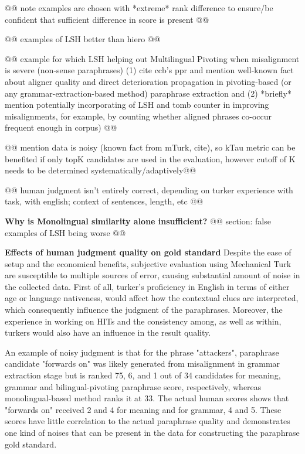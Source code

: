 \documentclass[11pt]{article}
\begin{document}
@@ note examples are chosen with *extreme* rank difference to ensure/be confident that sufficient difference in score is present @@

@@ examples of LSH better than hiero @@


@@ example for which LSH helping out Multilingual Pivoting when misalignment is severe (non-sense paraphrases) (1) cite ccb's ppr and mention well-known fact about aligner quality and direct deterioration propagation in pivoting-based (or any grammar-extraction-based method) paraphrase extraction and (2) *briefly* mention potentially incorporating of LSH and tomb counter in improving misalignments, for example, by counting whether aligned phrases co-occur frequent enough in corpus) @@






@@ mention data is noisy (known fact from mTurk, cite), so kTau metric can be benefited if only topK candidates are used in the evaluation, however cutoff of K needs to be determined systematically/adaptively@@

@@ human judgment isn't entirely correct, depending on turker experience with task, with english; context of sentences, length, etc @@

{\bf Why is Monolingual similarity alone insufficient?}
@@ section: false examples of LSH being worse @@

{\bf Effects of human judgment quality on gold standard}
Despite the ease of setup and the economical benefits, subjective evaluation using Mechanical Turk are susceptible to multiple sources of error, causing substantial amount of noise in the collected data. First of all, turker's proficiency in English in terms of either age or language nativeness, would affect how the contextual clues are interpreted, which consequently influence the judgment of the paraphrases. Moreover, the experience in working on HITs and the consistency among, as well as within, turkers would also have an influence in the result quality. 

An example of noisy judgment is that for the phrase "attackers", paraphrase candidate "forwards on" was likely generated from misalignment in grammar extraction stage but is ranked 7\.5, 6, and 1 out of 34 candidates for meaning, grammar and bilingual-pivoting paraphrase score, respectively, whereas monolingual-based method ranks it at 33. The actual human scores shows that "forwards on" received 2 and 4 for meaning and for grammar, 4 and 5. These scores have little correlation to the actual paraphrase quality and demonstrates one kind of noises that can be present in the data for constructing the paraphrase gold standard.
\end{document}
